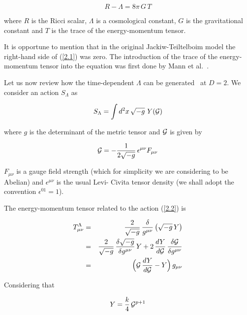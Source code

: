 \documentclass[a4paper,twocolumn,prd,groupedaddress,nofootinbib,showpacs]
{revtex4}
\begin{document}
\begin{equation}
R-\Lambda=8\pi\,G\,T
\label{2.1}
\end{equation}

\noindent
where $R$ is the Ricci scalar, $\Lambda$ is a cosmological constant,
$G$ is the gravitational constant and $T$ is the trace of the
energy-momentum tensor.

\medskip
It is opportune to mention that in the original Jackiw-Teiltelboim
model the right-hand side of (\ref{2.1}) was zero. The introduction of
the trace of the energy-momentum tensor into the equation was first
done by Mann et al.~\cite{Mann}.

\medskip
Let us now review how the time-dependent $\Lambda$ can be
generated~\cite{Novello1,Novello2} at $D=2$. We consider an action
$S_\Lambda$ as

\begin{equation}
S_\Lambda=\int d^2x\,\sqrt{-g}\,\,Y({\cal G})
\label{2.2}
\end{equation}

\noindent
where $g$ is the determinant of the metric tensor and $\cal G$ is
given by~\cite{Novello1}

\begin{equation}
{\cal G}=-\frac{1}{2\sqrt{-g}}\,\epsilon^{\mu\nu}F_{\mu\nu}
\label{2.3}
\end{equation}

\noindent
$F_{\mu\nu}$ is a gauge field strength (which for simplicity we are
considering to be Abelian) and $\epsilon^{\mu\nu}$ is the usual Levi-
Civita tensor density (we shall adopt the convention $\epsilon^{01}=
1$).

\medskip
The energy-momentum tensor related to the action (\ref{2.2}) is
\cite{Birrell}

\begin{eqnarray}
T^\Lambda_{\mu\nu}&=&\frac{2}{\sqrt{-g}}\,
\frac{\delta}{g^{\mu\nu}}\,\bigl(\sqrt{-g}\,Y\bigr)
\nonumber\\
&=&\frac{2}{\sqrt{-g}}\,\frac{\delta\sqrt{-g}}{\delta g^{\mu\nu}}\,Y
+2\,\frac{dY}{d{\cal G}}\,\frac{\delta{\cal G}}{\delta g^{\mu\nu}}
\nonumber\\
&=&\Bigl({\cal G}\,\frac{dY}{d{\cal G}}-Y\Bigr)\,g_{\mu\nu}
\label{2.4}
\end{eqnarray}

Considering that \cite{Novello2}

\begin{equation}
Y=\frac{k}{4}\,{\cal G}^{p+1}
\label{2.5}
\end{equation}
\end{document}
